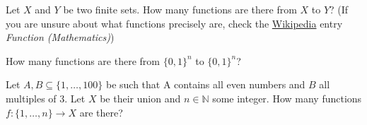 \documentclass[a4paper,10pt,landscape,twocolumn]{scrartcl}
\begin{document}
\begin{exercise}
  
  \begin{subex}[1pt]
    Let $X$ and $Y$ be two finite sets. How many functions are there from $X$
    to $Y$? (If you are unsure about what functions precisely are, check the
    \href{https://en.wikipedia.org/wiki/Function_(mathematics)}{Wikipedia}
    entry \emph{Function (Mathematics)})
  \end{subex}

  \begin{subex}[1pt]
    How many functions are there from $\{0,1\}^n$ to $\{0,1\}^n$?	
  \end{subex}
  
  \begin{subex}[1pt]
    Let $A, B \subseteq \{1, \dots, 100\}$ be such that A contains all even
    numbers and $B$ all multiples of 3. Let $X$ be their union and $n\in
    \mathbb{N}$ some integer. How many functions $f: \{1, \dots, n\} \to X$ are
    there?
  \end{subex}
\end{exercise}
\end{document}
